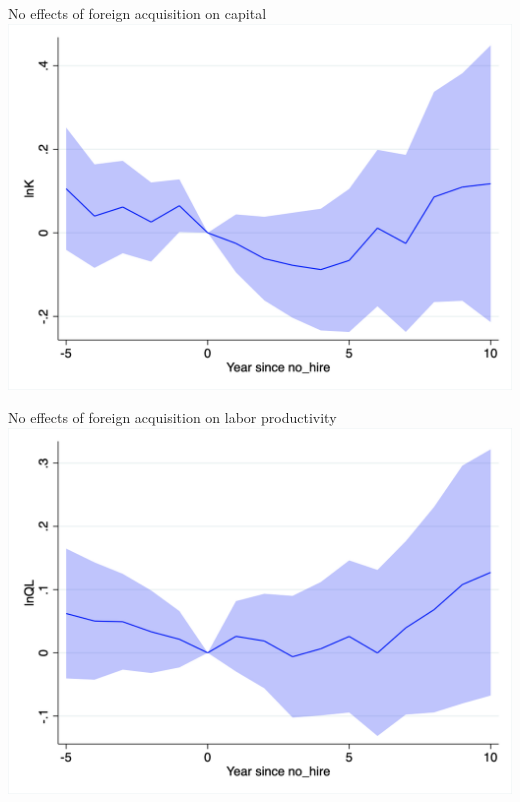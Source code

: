 \documentclass[
  ignorenonframetext,
  aspectratio=43,
]{beamer}
\begin{document}
\begin{frame}{No effects of foreign acquisition on capital}
\protect\hypertarget{no-effects-of-foreign-acquisition-on-capital}{}
\includegraphics{figure/event_study/no_hire_lnK.png}
\end{frame}

\begin{frame}{No effects of foreign acquisition on labor productivity}
\protect\hypertarget{no-effects-of-foreign-acquisition-on-labor-productivity}{}
\includegraphics{figure/event_study/no_hire_lnQL.png}
\end{frame}
\end{document}
